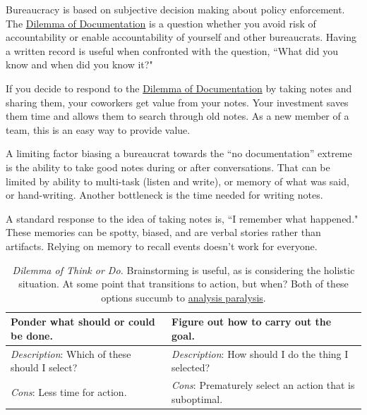 Bureaucracy is based on subjective decision making about policy enforcement. The \href{table:notes-or-no-notes}{Dilemma of Documentation} is a question whether you avoid risk of accountability or enable accountability of yourself and other bureaucrats. Having a written record is useful when confronted with the question, ``What did you know and when did you know it?"

If you decide to respond to the \href{table:notes-or-no-notes}{Dilemma of Documentation} by taking notes and sharing them, your coworkers get value from your notes. Your investment saves them time and allows them to search through old notes. 
As a new member of a team, this is an easy way to provide value.  

A limiting factor biasing a bureaucrat towards the ``no documentation'' extreme is the ability to take good notes during or after conversations. That can be limited by ability to multi-task (listen and write), or memory of what was said, or hand-writing. Another bottleneck is the time needed for writing notes.

A standard response to the idea of taking notes is, ``I remember what happened." These memories can be spotty, biased, and are verbal stories rather than artifacts. 
Relying on memory to recall events doesn't work for everyone. 

\begin{center}
\begin{table}[H] %
\begin{tabular}{ | m{\dilemmatablewidth}| m{\dilemmatablewidth} | } 
  \hline
  \textbf{Ponder what should or could be done.} &
  \textbf{Figure out how to carry out the goal.}\\
  \hline
  \textit{Description}: Which of these should I select? & 
  \textit{Description}: How should I do the thing I selected? \\
  \hline
  \textit{Cons}: Less time for action. & 
  \textit{Cons}: Prematurely select an action that is suboptimal. \\
  \hline
\end{tabular}
\caption{\textit{Dilemma of Think or Do.}
Brainstorming is useful, as is considering the holistic situation. At some point that transitions to action, but when? %
Both of these options succumb to \href{https://en.wikipedia.org/wiki/Analysis_paralysis}{analysis paralysis}.
}
\label{table:forest-vs-trees}
\end{table}
\end{center}

